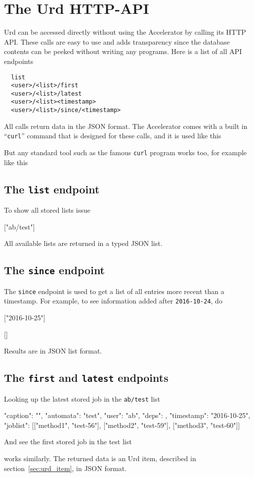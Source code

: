 \section{The Urd HTTP-API}
Urd can be accessed directly without using the Accelerator by calling
its HTTP API.  These calls are easy to use and adds transparency since
the database contents can be peeked without writing any programs.
Here is a list of all API endpoints
\begin{verbatim}
  list
  <user>/<list>/first
  <user>/<list>/latest
  <user>/<list><timestamp>
  <user>/<list>/since/<timestamp>
\end{verbatim}
All calls return data in the JSON format.  The Accelerator comes with
a built in ``\texttt{curl}'' command that is designed for these calls,
and it is used like this
\begin{shell}
\end{shell}
But any standard tool such as the famous \texttt{curl} program works
too, for example like this
\begin{shell}
\end{shell}


\subsection{The \texttt{list} endpoint}
To show all stored lists issue
\begin{shell}
["ab/test"]
\end{shell}
All available lists are returned in a typed JSON list.


\subsection{The \texttt{since} endpoint}
The \texttt{since} endpoint is used to get a list of all entries more
recent than a timestamp.  For example, to see information added
after \texttt{2016-10-24}, do
\begin{shell}
["2016-10-25"]
\end{shell}
\begin{shell}
[]
\end{shell}
Results are in JSON list format.


\subsection{The \texttt{first} and \texttt{latest} endpoints}
Looking up the latest stored job in the \texttt{ab/test} list
\begin{shell}
{"caption": "", "automata": "test", "user": "ab", "deps": {},
  "timestamp": "2016-10-25", "joblist": [["method1", "test-56"],
  ["method2", "test-59"], ["method3", "test-60"]]}
\end{shell}
And see the first stored job in the test list
\begin{shell}
\end{shell}
works similarly.  The returned data is an Urd item, described in
section~\ref{sec:urd_item}, in JSON format.


